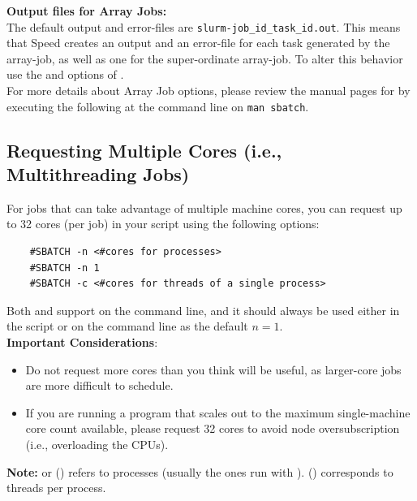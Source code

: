 \noindent \textbf{Output files for Array Jobs:}\\
The default output and error-files are \texttt{slurm-job\_id\_task\_id.out}.
%
This means that Speed creates an output and an error-file for each task 
generated by the array-job, as well as one for the super-ordinate array-job. 
To alter this behavior use the  and  options of .\\

For more details about Array Job options, please review the manual pages for 
 by executing the following at the command line on 
\texttt{man sbatch}.
 
\subsection{Requesting Multiple Cores (i.e., Multithreading Jobs)}
\label{sect:multicore-jobs}

For jobs that can take advantage of multiple machine cores, you can 
request up to 32 cores (per job) in your script using the following options:

\begin{verbatim}
	#SBATCH -n <#cores for processes>
	#SBATCH -n 1
	#SBATCH -c <#cores for threads of a single process>
\end{verbatim}

\noindent Both  and  support  on the command line,
and it should always be used either in the script or on the command line as the
default $n=1$.\\

\noindent \textbf{Important Considerations}:
\begin{itemize}
	\item Do not request more cores than you think will be useful, 
	as larger-core jobs are more difficult to schedule.

	\item If you are running a program that scales out to the maximum single-machine 
	core count available, please request 32 cores to avoid node 
	oversubscription (i.e., overloading the CPUs).
\end{itemize}

\noindent \textbf{Note:}  or 
() refers to processes (usually the ones run with ).
 () corresponds to threads per process.\\

